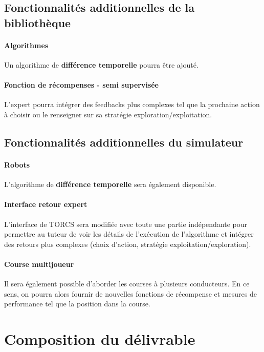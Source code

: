 \documentclass[a4paper,12pt]{article}
\begin{document}
	\subsection{Fonctionnalités additionnelles de la bibliothèque}
	  \paragraph{Algorithmes} Un algorithme de \textbf{différence temporelle} pourra être ajouté.
	  
	  \paragraph{Fonction de récompenses - semi supervisée} L'expert pourra intégrer des feedbacks plus complexes
	  tel que la prochaine action à choisir ou le renseigner sur sa stratégie exploration/exploitation.
	  
	\subsection{Fonctionnalités additionnelles du simulateur}
	  \paragraph{Robots} L'algorithme de \textbf{différence temporelle} sera également disponible.
	  \paragraph{Interface retour expert} L'interface de TORCS sera modifiée avec toute une partie indépendante
	  pour permettre au tuteur de voir les détails de l'exécution de l'algorithme et intégrer des retours plus 
	  complexes (choix d'action, stratégie exploitation/exploration).
	  \paragraph{Course multijoueur} Il sera également possible d'aborder les courses à plusieurs conducteurs. En 
	  ce sens, on pourra alors fournir de nouvelles fonctions de récompense et mesures de performance
	  tel que la position dans la course.
	  
  
  \newpage
  \section{Composition du délivrable}
  
\end{document}
